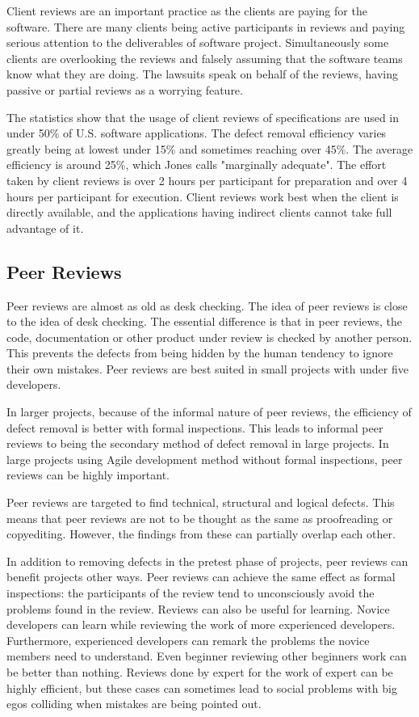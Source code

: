 Client reviews are an important practice as the clients are paying for the software. There are many clients being active participants in reviews and paying serious attention to the deliverables of software project. Simultaneously some clients are overlooking the reviews and falsely assuming that the software teams know what they are doing. The lawsuits speak on behalf of the reviews, having passive or partial reviews as a worrying feature.

The statistics show that the usage of client reviews of specifications are used in under 50\% of U.S. software applications. The defect removal efficiency varies greatly being at lowest under 15\% and sometimes reaching over 45\%. The average efficiency is around 25\%, which Jones calls "marginally adequate". The effort taken by client reviews is over 2 hours per participant for preparation and over 4 hours per participant for execution. Client reviews work best when the client is directly available, and the applications having indirect clients cannot take full advantage of it.

\subsection{Peer Reviews} 
Peer reviews are almost as old as desk checking. The idea of peer reviews is close to the idea of desk checking. The essential difference is that in peer reviews, the code, documentation or other product under review is checked by another person. This prevents the defects from being hidden by the human tendency to ignore their own mistakes. Peer reviews are best suited in small projects with under five developers. 

In larger projects, because of the informal nature of peer reviews, the efficiency of defect removal is better with formal inspections. This leads to informal peer reviews to being the secondary method of defect removal in large projects. In large projects using Agile development method without formal inspections, peer reviews can be highly important.

Peer reviews are targeted to find technical, structural and logical defects. This means that peer reviews are not to be thought as the same as proofreading or copyediting. However, the findings from these can partially overlap each other.

In addition to removing defects in the pretest phase of projects, peer reviews can benefit projects other ways. Peer reviews can achieve the same effect as formal inspections: the participants of the review tend to unconsciously avoid the problems found in the review. Reviews can also be useful for learning. Novice developers can learn while reviewing the work of more experienced developers. Furthermore, experienced developers can remark the problems the novice members need to understand. Even beginner reviewing other beginners work can be better than nothing. Reviews done by expert for the work of expert can be highly efficient, but these cases can sometimes lead to social problems with big egos colliding when mistakes are being pointed out.

